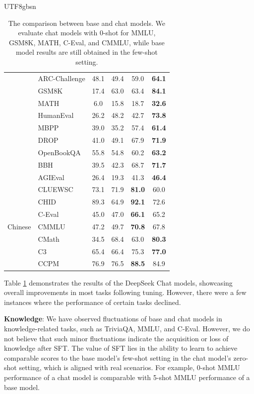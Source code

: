 \documentclass[11pt, a4paper, logo, copyright, nonumbering]{deepseek}
\begin{document}
\begin{CJK*}{UTF8}{gbsn}
\begin{table}[t]
{\begin{tabular}{c|l|c|c|c|c}
&ARC-Challenge & 48.1 & 49.4 & 59.0 & \textbf{64.1} \\
&GSM8K & 17.4 & 63.0 & 63.4 & \textbf{84.1} \\

&MATH & 6.0 & 15.8 &18.7& \textbf{32.6}\\

&HumanEval & 26.2 & 48.2 & 42.7 & \textbf{73.8} \\

&MBPP & 39.0 & 35.2 & 57.4 & \textbf{61.4} \\


&DROP & 41.0 & 49.1 & 67.9 & \textbf{71.9 }\\

&OpenBookQA & 55.8 & 54.8 & 60.2 & \textbf{63.2 }\\

&BBH & 39.5 & 42.3 & 68.7 & \textbf{71.7} \\

&AGIEval & 26.4 & 19.3 & 41.3 & \textbf{46.4} \\
\midrule
\multirow{7}{*}{Chinese}&CLUEWSC & 73.1 & 71.9 & \textbf{81.0} & 60.0 \\

&CHID & 89.3 & 64.9 & \textbf{92.1} & 72.6 \\

&C-Eval & 45.0 & 47.0 & \textbf{66.1} & 65.2 \\

&CMMLU & 47.2 & 49.7 &\textbf{70.8 }& 67.8 \\

&CMath & 34.5 & 68.4 & 63.0 & \textbf{80.3} \\
&C3 &  65.4 & 66.4 & 75.3 & \textbf{77.0} \\

&CCPM &  76.9 & 76.5 & \textbf{88.5} & 84.9 \\
\bottomrule
\end{tabular}}
    \caption{The comparison between base and chat models. We evaluate chat models with 0-shot for MMLU, GSM8K, MATH, C-Eval, and CMMLU, while base model results are still obtained in the few-shot setting.  }
    \label{tab: chat}
\end{table}

Table \ref{tab: chat} demonstrates the results of the DeepSeek Chat models, showcasing overall improvements in most tasks following tuning. However, there were a few instances where the performance of certain tasks declined.


\textbf{Knowledge}: We have observed fluctuations of base and chat models in knowledge-related tasks, such as TriviaQA, MMLU, and C-Eval. However, we do not believe that such minor fluctuations indicate the acquisition or loss of knowledge after SFT. The value of SFT lies in the ability to learn to achieve comparable scores to the base model's few-shot setting in the chat model's zero-shot setting, which is aligned with real scenarios. For example, 0-shot MMLU performance of a chat model is comparable with 5-shot MMLU performance of a base model. 


\end{CJK*}
\end{document}
